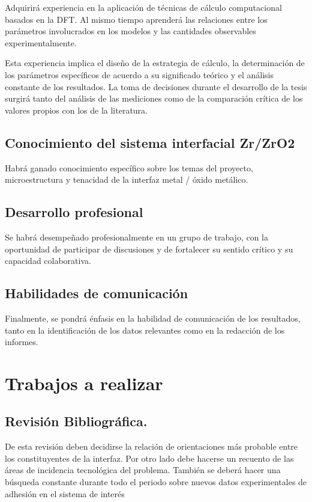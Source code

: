 Adquirirá experiencia en la aplicación de técnicas de cálculo computacional 
basados en la DFT. Al mismo tiempo aprenderá las relaciones entre los 
parámetros involucrados en los modelos y las cantidades observables 
experimentalmente.

Esta experiencia implica el diseño de la estrategia de cálculo, la 
determinación de los parámetros específicos de acuerdo a su significado teórico 
y el análisis constante de los resultados. La toma de decisiones durante el 
desarrollo de la tesis surgirá tanto del análisis de las mediciones como de la 
comparación crítica de los valores propios con los de la literatura.

\subsection{ Conocimiento del sistema interfacial Zr/ZrO2 }

Habrá ganado conocimiento específico sobre los temas del proyecto, 
microestructura y tenacidad de la interfaz metal / óxido metálico. 

\subsection{ Desarrollo profesional}

Se habrá desempeñado profesionalmente en un grupo de trabajo, con la 
oportunidad de participar de discusiones y de fortalecer su sentido crítico y 
su capacidad colaborativa.

\subsection{ Habilidades de comunicación }

Finalmente, se pondrá énfasis en la habilidad de comunicación de los 
resultados, tanto en la identificación de los datos relevantes como en la 
redacción de los informes. 

\section{Trabajos a realizar}

\subsection{ Revisión Bibliográfica. }

De esta revisión deben decidirse la relación de orientaciones más probable 
entre los constituyentes de la interfaz. Por otro lado debe hacerse un recuento 
de las áreas de incidencia tecnológica del problema. También se deberá hacer 
una búsqueda constante durante todo el periodo sobre nuevos datos 
experimentales de adhesión en el sistema de interés

